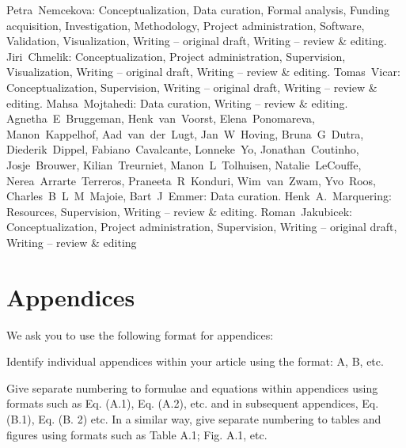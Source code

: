 \documentclass[preprint,12pt]{elsarticle}
\begin{document}
Petra~Nemcekova: Conceptualization, Data curation, Formal analysis, Funding acquisition, Investigation, Methodology, Project administration, Software, Validation, Visualization, Writing – original draft, Writing – review \& editing. Jiri~Chmelik: Conceptualization, Project administration, Supervision, Visualization, Writing – original draft, Writing – review \& editing. Tomas~Vicar: Conceptualization, Supervision, Writing – original draft, Writing – review \& editing. Mahsa~Mojtahedi: Data curation, Writing – review \& editing. Agnetha~E~Bruggeman, Henk~van~Voorst, Elena~Ponomareva, Manon~Kappelhof, Aad~van~der~Lugt, Jan~W~Hoving, Bruna~G~Dutra, Diederik~Dippel, Fabiano~Cavalcante, Lonneke~Yo, Jonathan~Coutinho, Josje~Brouwer, Kilian~Treurniet, Manon~L~Tolhuisen, Natalie~LeCouffe, Nerea~Arrarte~Terreros, Praneeta~R~Konduri, Wim~van~Zwam, Yvo~Roos, Charles~B~L~M~Majoie, Bart~J~Emmer: Data curation. Henk~A.~Marquering: Resources, Supervision, Writing – review \& editing. Roman~Jakubicek: Conceptualization, Project administration, Supervision, Writing – original draft, Writing – review \& editing


\section{Appendices}
We ask you to use the following format for appendices:

Identify individual appendices within your article using the format: A, B, etc.

Give separate numbering to formulae and equations within appendices using formats such as Eq. (A.1), Eq. (A.2), etc. and in subsequent appendices, Eq. (B.1), Eq. (B. 2) etc. In a similar way, give separate numbering to tables and figures using formats such as Table A.1; Fig. A.1, etc.




\end{document}
